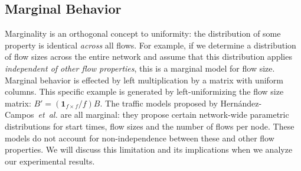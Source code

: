 \documentclass[twocolumn,final]{svjour3}
\newcommand{\caps}[1]{{\small{#1}}}
\newcommand{\Section}[1]{\hyperref[sec:#1]{Section~\ref*{sec:#1}}}
\newcommand{\FHC}{Hern\'andez-Campos~\textit{et~al.}}
\newcommand{\R}{\mathbb{R}}
\newcommand{\ones}[1]{\mathbf{1}_{#1}}
\newcommand{\zeros}[1]{\mathbf{0}_{#1}}
\newcommand{\seq}[1]{\left<#1\right>}
\begin{document}

\subsection{Marginal Behavior}

Marginality is an orthogonal concept to uniformity: the distribution of some property is identical \textit{across} all flows. For example, if we determine a distribution of flow sizes across the entire network and assume that this distribution applies \textit{independent of other flow properties}, this is a marginal model for flow size. Marginal behavior is effected by left multiplication by a matrix with uniform columns. This specific example is generated by left-uniformizing the flow size matrix: $B' = (\ones{f \times f}/f)B$.
The traffic models proposed by {\FHC} are all marginal: they propose certain network-wide parametric distributions for start times, flow sizes and the number of flows per node. These models do not account for non-independence between these and other flow properties. We will discuss this limitation and its implications when we analyze our experimental results.
\end{document}
